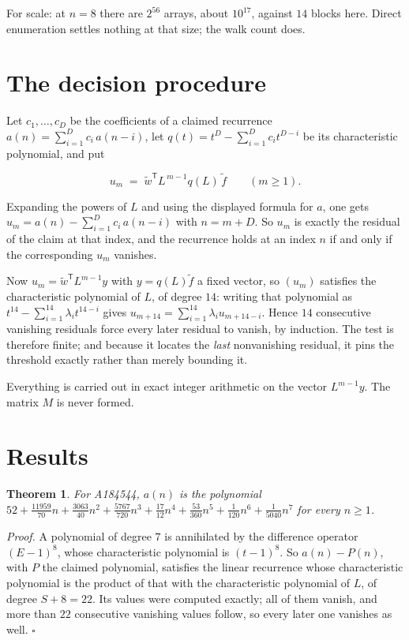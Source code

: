 \documentclass[11pt]{article}
\newtheorem{theorem}{Theorem}
\theoremstyle{definition}
\begin{document}
For scale: at $n = 8$ there are $2^{56}$ arrays, about $10^{17}$, against $14$ blocks here. Direct enumeration settles nothing at that size; the walk count does.

\section{The decision procedure}

Let $c_1,\dots,c_D$ be the coefficients of a claimed recurrence $a(n) = \sum_{i=1}^{D} c_i\,a(n-i)$, let $q(t) = t^{D} - \sum_{i=1}^{D} c_i t^{D-i}$ be its characteristic polynomial, and put

\[u_m \;=\; \tilde w^{\mathsf T} L^{\,m-1} q(L)\,\tilde f \qquad (m \ge 1).\]

Expanding the powers of $L$ and using the displayed formula for $a$, one gets $u_m = a(n) - \sum_{i=1}^{D} c_i\,a(n-i)$ with $n = m + D$. So $u_m$ is exactly the residual of the claim at that index, and the recurrence holds at an index $n$ if and only if the corresponding $u_m$ vanishes.

Now $u_m = \tilde w^{\mathsf T} L^{m-1} y$ with $y = q(L)\tilde f$ a fixed vector, so $(u_m)$ satisfies the characteristic polynomial of $L$, of degree $14$: writing that polynomial as $t^{14} - \sum_{i=1}^{14} \lambda_i t^{14-i}$ gives $u_{m+14} = \sum_{i=1}^{14} \lambda_i u_{m+14-i}$. Hence $14$ consecutive vanishing residuals force every later residual to vanish, by induction. The test is therefore finite; and because it locates the {\itshape last} nonvanishing residual, it pins the threshold exactly rather than merely bounding it.

Everything is carried out in exact integer arithmetic on the vector $L^{m-1}y$. The matrix $M$ is never formed.

\section{Results}

\begin{theorem} For A184544, $a(n)$ is the polynomial $52 + \frac{11959}{70}n + \frac{3063}{40}n^{2} + \frac{5767}{720}n^{3} + \frac{17}{12}n^{4} + \frac{53}{360}n^{5} + \frac{1}{120}n^{6} + \frac{1}{5040}n^{7}$ for every $n \ge 1$.\end{theorem}

{\itshape Proof.} A polynomial of degree $7$ is annihilated by the difference operator $(E-1)^{8}$, whose characteristic polynomial is $(t-1)^{8}$. So $a(n) - P(n)$, with $P$ the claimed polynomial, satisfies the linear recurrence whose characteristic polynomial is the product of that with the characteristic polynomial of $L$, of degree $S + 8 = 22$. Its values were computed exactly; all of them vanish, and more than $22$ consecutive vanishing values follow, so every later one vanishes as well. $\square$
\end{document}
